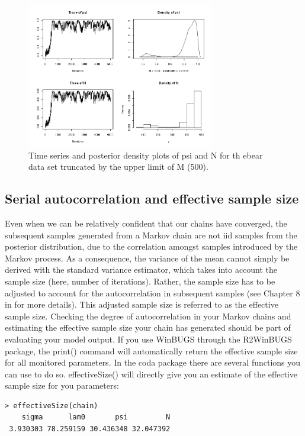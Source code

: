\begin{figure}
\begin{center}
\includegraphics[height=2.5in]{figs/timeseries2}
\end{center}
\caption{Time series and posterior density plots of psi and N for th
  ebear data set truncated by the upper limit of M (500).} 
\label{timeseries2.fig}
\end{figure}

\subsection{Serial autocorrelation and effective sample size}
Even when we can be relatively confident that our chains have converged, the subsequent samples generated from a Markov chain are not iid samples from the posterior distribution, due to the correlation amongst samples introduced by the Markov process. As a consequence, the variance of the mean cannot simply be derived with the standard variance estimator, which takes into account the sample size (here, number of iterations). Rather, the sample size has to be adjusted to account for the autocorrelation in subsequent samples (see Chapter 8 in \citet{Robert_casella:2010} for more details). This adjusted sample size is referred to as the effective sample size. Checking the degree of autocorrelation in your Markov chains and estimating the effective sample size your chain has generated should be part of evaluating your model output. If you use WinBUGS through the R2WinBUGS package, the print() command will automatically return the effective sample size for all monitored parameters. In the coda package there are several functions you can use to do so. effectiveSize() will directly give you an estimate of the effective sample size for you parameters:
\begin{verbatim}
> effectiveSize(chain)
    sigma      lam0       psi         N 
 3.930303 78.259159 30.436348 32.047392
\end{verbatim} 

